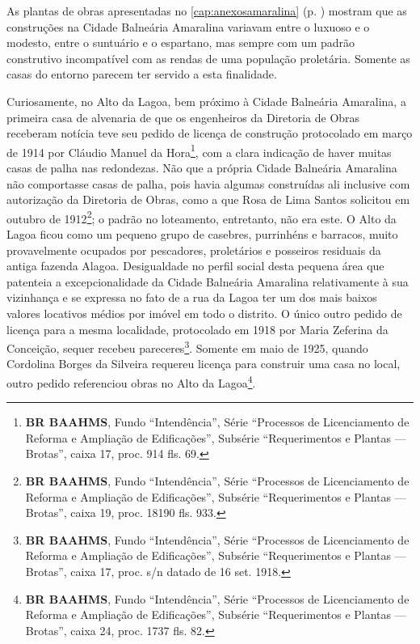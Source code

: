 



As plantas de obras apresentadas no \autoref{cap:anexosamaralina} (p. \pageref{cap:anexosamaralina}) mostram que as construções na Cidade Balneária Amaralina variavam entre o luxuoso e o modesto, entre o suntuário e o espartano, mas sempre com um padrão construtivo incompatível com as rendas de uma população proletária. Somente as casas do entorno parecem ter servido a esta finalidade.


Curiosamente, no Alto da Lagoa, bem próximo à Cidade Balneária Amaralina, a primeira casa de alvenaria de que os engenheiros da Diretoria de Obras receberam notícia teve seu pedido de licença de construção protocolado em março de 1914 por Cláudio Manuel da Hora\footnote{\textbf{BR BAAHMS}, Fundo ``Intendência'', Série ``Processos de Licenciamento de Reforma e Ampliação de Edificações'', Subsérie ``Requerimentos e Plantas --- Brotas'', caixa 17, proc. 914 fls. 69.}, com a clara indicação de haver muitas casas de palha nas redondezas. Não que a própria Cidade Balneária Amaralina não comportasse casas de palha, pois havia algumas construídas ali inclusive com autorização da Diretoria de Obras, como a que Rosa de Lima Santos solicitou em outubro de 1912\footnote{\textbf{BR BAAHMS}, Fundo ``Intendência'', Série ``Processos de Licenciamento de Reforma e Ampliação de Edificações'', Subsérie ``Requerimentos e Plantas --- Brotas'', caixa 19, proc. 18190 fls. 933.}; o padrão no loteamento, entretanto, não era este. O Alto da Lagoa ficou como um pequeno grupo de casebres, purrinhéns e barracos, muito provavelmente ocupados por pescadores, proletários e posseiros residuais da antiga fazenda Alagoa. Desigualdade no perfil social desta pequena área que patenteia a excepcionalidade da Cidade Balneária Amaralina relativamente à sua vizinhança e se expressa no fato de a rua da Lagoa ter um dos mais baixos valores locativos médios por imóvel em todo o distrito. O único outro pedido de licença para a mesma localidade, protocolado em 1918 por Maria Zeferina da Conceição, sequer recebeu pareceres\footnote{\textbf{BR BAAHMS}, Fundo ``Intendência'', Série ``Processos de Licenciamento de Reforma e Ampliação de Edificações'', Subsérie ``Requerimentos e Plantas --- Brotas'', caixa 17, proc. s/n datado de 16 set. 1918.}. Somente em maio de 1925, quando Cordolina Borges da Silveira requereu licença para construir uma casa no local, outro pedido referenciou obras no Alto da Lagoa\footnote{\textbf{BR BAAHMS}, Fundo ``Intendência'', Série ``Processos de Licenciamento de Reforma e Ampliação de Edificações'', Subsérie ``Requerimentos e Plantas --- Brotas'', caixa 24, proc. 1737 fls. 82.}.

